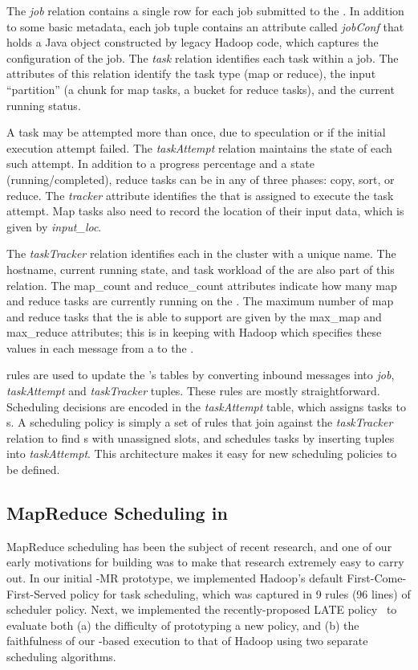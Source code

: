 The \emph{job} relation contains a single row for each job submitted to the
{\JT}. In addition to some basic metadata, each job tuple contains an attribute
called \emph{jobConf} that holds a Java object constructed by legacy Hadoop
code, which captures the configuration of the job. The \emph{task} relation
identifies each task within a job. The attributes of this relation identify the
task type (map or reduce), the input ``partition'' (a chunk for map tasks, a
bucket for reduce tasks), and the current running status.

A task may be attempted more than once, due to speculation or if the initial
execution attempt failed.  The \emph{taskAttempt} relation maintains the state
of each such attempt.  In addition to a progress percentage and a state
(running/completed), reduce tasks can be in any of three phases: copy, sort, or
reduce. The \emph{tracker} attribute identifies the {\TT} that is assigned to
execute the task attempt. Map tasks also need to record the location of their
input data, which is given by \emph{input\_loc}. 

The \emph{taskTracker} relation identifies each {\TT} in the cluster with a unique name.
The hostname, current running state, and task workload of the \TT are also part of this relation. 
The map\_count and reduce\_count attributes indicate how many map and reduce tasks are currently 
running on the \TT. The maximum number of map and reduce tasks that the \TT is able to support are 
given by the max\_map and max\_reduce attributes; this is in keeping with Hadoop which specifies 
these values in each message from a \TT to the \JT. 

\OVERLOG rules are used to update the {\JT}'s tables by converting inbound messages
into \emph{job}, \emph{taskAttempt} and \emph{taskTracker} tuples. These rules
are mostly straightforward. Scheduling decisions are encoded in the
\emph{taskAttempt} table, which assigns tasks to {\TT}s. A scheduling policy is
simply a set of rules that join against the \emph{taskTracker} relation to find
\TT{}s with unassigned slots, and schedules tasks by inserting tuples into
\emph{taskAttempt}. This architecture makes it easy for new scheduling policies
to be defined.

\subsection{MapReduce Scheduling in \OVERLOG}

MapReduce scheduling has been the subject of recent research, and one
of our early motivations for building \BOOMA was to make that research
extremely easy to carry out. In our initial \BOOM-MR prototype, we
implemented Hadoop's default First-Come-First-Served policy for task
scheduling, which was captured in 9 rules (96 lines) of scheduler
policy. Next, we implemented the recently-proposed LATE
policy~\cite{late-sched} to evaluate both (a) the difficulty of
prototyping a new policy, and (b) the faithfulness of our
\OVERLOG-based execution to that of Hadoop using two separate
scheduling algorithms.


